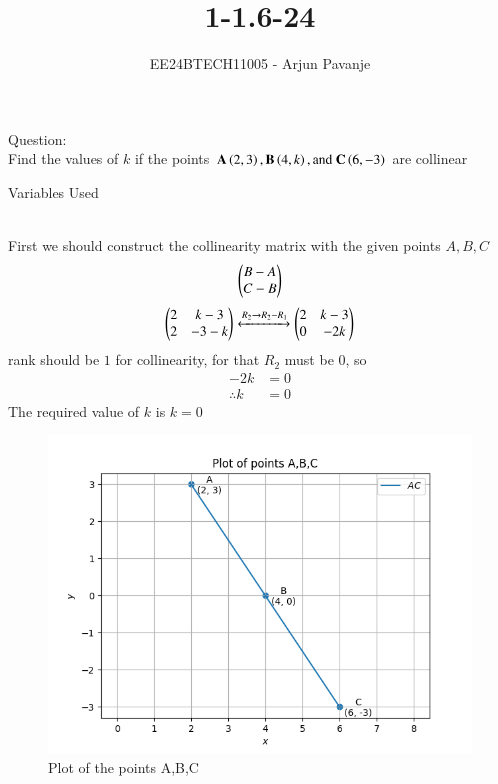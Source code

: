 \documentclass[journal]{IEEEtran}
\begin{document}

\vspace{3cm}

\title{1-1.6-24}
\author{EE24BTECH11005 - Arjun Pavanje
}
{\let\newpage\relax\maketitle}
Question:\\
Find the values of $k$ if the points $\mathbf{A}\left(2,3\right), \mathbf{B}\left(4,k\right), \text{and } \mathbf{C}\left(6,-3\right)$ are collinear\\
\solution
\begin{table}[h!]    
  \centering
  
  \caption{Variables Used}
  \label{tab1-1.5-29}
\end{table}\\
First we should construct the collinearity matrix with the given points $A,B,C$
\begin{align}
\begin{pmatrix}
B-A \\
C-B
\end{pmatrix}
\end{align}
\begin{align}
\begin{pmatrix}
2 & k-3\\
2 & -3-k
\end{pmatrix}
\xleftrightarrow[]{R_2 \rightarrow {R_2-R_1}}
\begin{pmatrix}
2 & k-3\\
0 & -2k
\end{pmatrix}
\end{align}
rank should be $1$ for collinearity, for that $R_2$ must be 0, so
\begin{align}
	-2k&=0\\
	\therefore k&=0
\end{align}
The required value of $k$ is $k=0$ 
\begin{figure}[h!]
   \centering
   \includegraphics[width=0.7\linewidth]{figs/Figure_1.png}
   \caption{Plot of the points A,B,C}
   \label{stemplot}
\end{figure}
\end{document}
